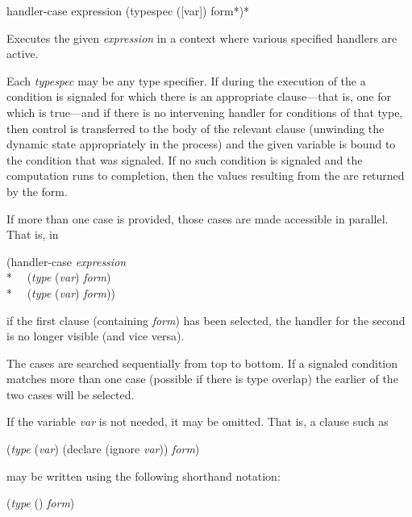 \begin{defmac}
handler-case expression {(typespec ([var]) {form}*)}*

  Executes the given \emph{expression} in a context where various specified handlers are active.

  Each \emph{typespec} may be any type specifier. If during the execution of the 
  a condition is signaled for which there is an appropriate clause---that is, one
  for which  is true---and if there is no intervening
  handler for conditions of that type, then control is transferred to the body
  of the relevant clause (unwinding the dynamic state appropriately in the
  process) and the given variable  is bound to the condition that was signaled. If
  no such condition is signaled and the computation runs to completion, then
  the values resulting from the  are returned by the  form.

  If more than one case is provided, those cases are made accessible in
  parallel. That is, in
\begin{lisp}
(handler-case \emph{expression} \\*
~~(\emph{type} (\emph{var}) \emph{form}) \\*
~~(\emph{type} (\emph{var}) \emph{form}))
\end{lisp}
  if the first clause (containing \emph{form}) has been selected, the handler
  for the second is no longer visible (and vice versa).

  The cases are searched sequentially from top to bottom. If a signaled condition
  matches more than one case (possible if there is type
  overlap) the earlier of the two cases will be selected.



  If the variable \emph{var} is not needed, it may be omitted. That is, a clause such as
\begin{lisp}
(\emph{type} (\emph{var}) (declare (ignore \emph{var})) \emph{form})
\end{lisp}
may be written using the following shorthand notation:
\begin{lisp}
(\emph{type} () \emph{form})
\end{lisp}


\end{defmac}
